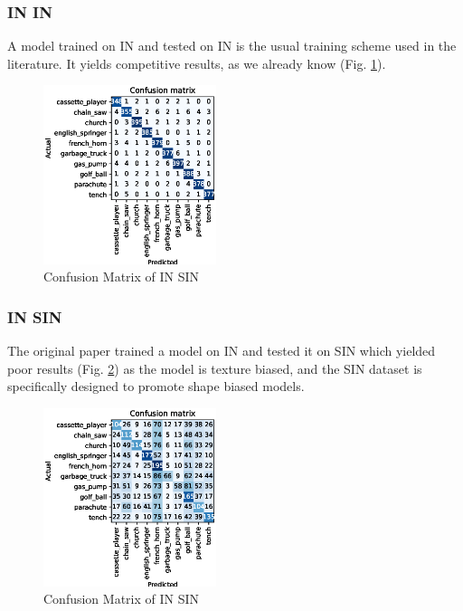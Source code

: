 \documentclass{article}
\begin{document}
\subsubsection{IN \texorpdfstring{\textrightarrow} .IN}
A model trained on IN and tested on IN is the usual training scheme used in the literature.
It yields competitive results, as we already know (Fig. \ref{cm_in-in}).

\begin{figure}[h!]
  \includegraphics[width = 0.45\textwidth]{imgs/in/in-in/in-in_confusion_matrix_0.963.eps}
  \caption{Confusion Matrix of IN \texorpdfstring{\textrightarrow} .SIN}
  \label{cm_in-in}
\end{figure}

\subsubsection{IN \texorpdfstring{\textrightarrow} .SIN}



The original paper trained a model on IN and tested it on SIN which yielded poor results (Fig. \ref{cm_in-sin}) as 
the model is texture biased, and the SIN dataset is specifically designed to promote shape biased models.

\begin{figure}[h!]
  \includegraphics[width = 0.45\textwidth]{imgs/in/in-sin/in-sin_confusion_matrix_0.313.eps}
  \caption{Confusion Matrix of IN \texorpdfstring{\textrightarrow} .SIN}
  \label{cm_in-sin}
\end{figure}
\end{document}
